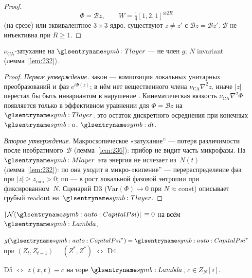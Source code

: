 \begin{proof}
\[
  \Phi=\mathcal{B}z,\qquad W=\tfrac14[1,2,1]^{\otimes 2R}
\]
(на срезе) или эквивалентное $3\times 3$-ядро.
существуют $z\ne z'$ с $\mathcal{B}z=\mathcal{B}z'$.
\phence $\mathcal{B}$ не инъективна при $R\ge 1$.
\end{proof}

\begin{proposition}
\label{prop:237}
$\nu_{\mathrm{CA}}$-затухание на $\Tlayer$ --- не член $g$; $N$ invariant (лемма~\ref{lem:232}).
\end{proposition}

\begin{proof}
\emph{Первое утверждение.}
закон --- композиция локальных унитарных преобразований
и фаз $e^{i\Phi(z)}$; в нём нет вещественного члена $\nu_{\mathrm{CA}}\nabla^2 z$,
 иначе $|z|$ перестал бы быть инвариантом в нарушение .
Кинематическая вязкость $\nu_{\mathrm{CA}}\nabla^2\Phi$ появляется только в эффективном
уравнении для $\Phi=\mathcal{B}z$ на~$\Tlayer$:
это остаток дискретного осреднения при конечных $\caStepSpace$, $\htick$.

\smallskip
\emph{Второе утверждение.}
Макроскопическое «затухание'' --- потеря различимости после необратимого~$\mathcal{B}$
(лемма~\ref{lem:236}): прибор не видит часть микрофазы.
На~$\Mlayer$ эта энергия не исчезает из~$N(t)$ (лемма~\ref{lem:232}):
по  она уходит в микро-«кипение'' --- перераспределение фаз
при $|z|\ge z_{\min}>0$; по  --- в рост локальной фазовой энтропии
при фиксированном~$N$.
Сценарий D3 ($\mathrm{Var}(\Phi)\to 0$ при $N\approx\mathrm{const}$) описывает
грубый readout на~$\Tlayer$.
\end{proof}

\begin{definition}
\label{def:D4}
$\lfloor\mathcal{N}(\symCapitalPsi)\rfloor\equiv 0$ на всём $\carrierLattice$.
\end{definition}

\begin{definition}
\label{def:D5}
$g(\symCapitalPsi^*)=\symCapitalPsi^*$ при $(Z_t,Z_{t-1})=(Z^*,Z^*)$ $\Leftrightarrow$ D4.
\end{definition}

\begin{lemma}[Классификация D5]
\label{lem:238a}
D5 $\Leftrightarrow$ $z(x,t)\equiv c$ на торе $\carrierLattice$, $c\in Z_N[i]$.
\end{lemma}

